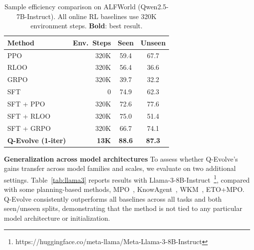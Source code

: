 \documentclass{article}
\theoremstyle{plain}
\theoremstyle{definition}
\theoremstyle{remark}
\begin{document}
\begin{table}[t]
\centering
\small
\caption{Sample efficiency comparison on ALFWorld (Qwen2.5-7B-Instruct). All online RL baselines use 320K environment steps. \textbf{Bold}: best result.}
\setlength{\tabcolsep}{4pt}
\begin{tabular}{lrcc}
\toprule
Method & Env.\ Steps & Seen & Unseen \\
\midrule
PPO~\citep{schulman2017proximalpolicyoptimizationalgorithms}   & 320K & 59.4 & 67.7 \\
RLOO                                                           & 320K & 56.4 & 36.6 \\
GRPO~\citep{gigpo}                                             & 320K & 39.7 & 32.2 \\
SFT                                                            &  0   & 74.9 & 62.3 \\
SFT + PPO                                                      & 320K & 72.6 & 77.6 \\
SFT + RLOO                                                     & 320K & 75.0 & 51.4 \\
SFT + GRPO                                                     & 320K & 66.7 & 74.1 \\
\midrule
\textbf{Q-Evolve (1-iter)}                                     & \textbf{13K} & \textbf{88.6} & \textbf{87.3} \\
\bottomrule
\end{tabular}
\label{tab:sample-efficiency}
\vspace{-5pt}
\end{table}




\textbf{Generalization across model architectures}
\label{sec:generalization} To assess whether Q-Evolve's gains transfer across model families and scales, we evaluate on two additional settings.
Table~\ref{tab:llama3} reports results with Llama-3-8B-Instruct~\footnote{https://huggingface.co/meta-llama/Meta-Llama-3-8B-Instruct}, compared with some planning-based methods, MPO~\citep{xiong-etal-2025-mpo}, KnowAgent~\citep{zhu-etal-2025-knowagent}, WKM~\citep{qiao2024agent}, ETO+MPO.
Q-Evolve consistently outperforms all baselines across all tasks and both seen/unseen splits, demonstrating that the method is not tied to any particular model architecture or initialization.
\end{document}
